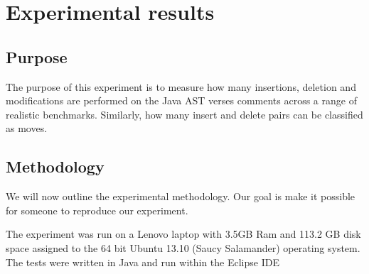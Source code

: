 
\chapter{Experimental results}

\section{Purpose}
The purpose of this experiment is to measure how many insertions, deletion and modifications are performed on the Java AST verses comments across a range of realistic benchmarks. Similarly, how many insert and delete pairs can be classified as moves.


\section{Methodology}
We will now outline the experimental methodology. Our goal is make it possible for someone to reproduce our experiment.

The experiment was run on a Lenovo laptop with 3.5GB Ram and 113.2 GB disk space assigned to the 64 bit Ubuntu 13.10 (Saucy Salamander) operating system. The tests were written in Java and run within the Eclipse IDE



 
 
